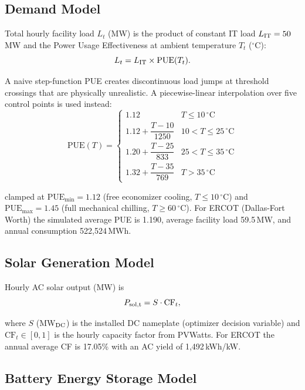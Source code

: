 \documentclass[conference]{IEEEtran}
\begin{document}
\subsection{Demand Model}

Total hourly facility load $L_t$ (MW) is the product of constant IT load
$L_{\rm IT} = 50$\,MW and the Power Usage Effectiveness at ambient
temperature $T_t$ ($^\circ$C):
%
\begin{equation}
  L_t = L_{\rm IT} \times \mathrm{PUE}(T_t).
  \label{eq:load}
\end{equation}

A naive step-function PUE creates discontinuous load jumps at threshold
crossings that are physically unrealistic.
A piecewise-linear interpolation over five control points is used instead:
%
\begin{equation}
  \mathrm{PUE}(T) =
  \begin{cases}
    1.12 & T \leq 10\,^\circ\mathrm{C} \\[2pt]
    1.12 + \dfrac{T-10}{1250} & 10 < T \leq 25\,^\circ\mathrm{C} \\[6pt]
    1.20 + \dfrac{T-25}{833} & 25 < T \leq 35\,^\circ\mathrm{C} \\[6pt]
    1.32 + \dfrac{T-35}{769} & T > 35\,^\circ\mathrm{C}
  \end{cases}
  \label{eq:pue}
\end{equation}

\noindent clamped at $\mathrm{PUE}_{\min}=1.12$ (free economizer cooling,
$T\leq 10\,^\circ$C) and $\mathrm{PUE}_{\max}=1.45$ (full mechanical
chilling, $T\geq 60\,^\circ$C).
For ERCOT (Dallas-Fort Worth) the simulated average PUE is 1.190, average
facility load 59.5\,MW, and annual consumption 522,524\,MWh.

\subsection{Solar Generation Model}

Hourly AC solar output (MW) is
%
\begin{equation}
  P_{\rm sol,t} = S \cdot \mathrm{CF}_t,
  \label{eq:solar}
\end{equation}

\noindent where $S$ (MW$_{\rm DC}$) is the installed DC nameplate (optimizer
decision variable) and $\mathrm{CF}_t \in [0,1]$ is the hourly capacity
factor from PVWatts.
For ERCOT the annual average CF is 17.05\% with an AC yield of
1,492\,kWh/kW.

\subsection{Battery Energy Storage Model}
\end{document}
